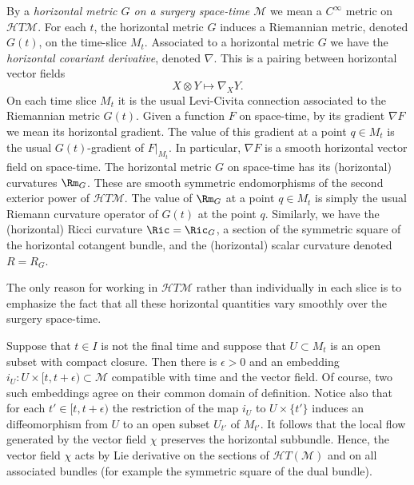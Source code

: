 \begin{definition}
\label{def:horizontal-metric}
By a {\em horizontal metric $G$ on a surgery space-time ${\mathcal
M}$} we mean a $C^\infty$ metric on ${\mathcal HT}{\mathcal M}$. For
each $t$, the horizontal metric $G$ induces a Riemannian metric,
denoted $G(t)$, on the time-slice $M_t$. Associated to a horizontal
metric $G$ we have the {\em horizontal covariant derivative},
denoted $\nabla$. This is a pairing between horizontal vector fields
$$X\otimes Y\mapsto \nabla_XY.$$
On each time slice $M_t$ it is the usual Levi-Civita connection associated to
the Riemannian metric $G(t)$. Given a function $F$ on space-time, by its
gradient $\nabla F$ we mean its horizontal gradient. The value of this gradient
at a point $q\in M_t$ is the usual $G(t)$-gradient of $F|_{M_t}$. In
particular, $\nabla F$ is a smooth horizontal vector field on space-time. The
horizontal metric $G$ on space-time has its (horizontal) curvatures $\Rm_G$.
These are smooth symmetric endomorphisms of the second exterior power of
${\mathcal HT}{\mathcal M}$. The value of $\Rm_G$ at a point $q\in M_t$ is
simply the usual Riemann curvature operator of $G(t)$ at the point $q$.
Similarly, we have the (horizontal) Ricci curvature $\Ric=\Ric_G$, a
section of the symmetric square of the horizontal cotangent bundle, and the
(horizontal) scalar curvature denoted $R=R_G$.
\end{definition}

The only reason for working in ${\mathcal HT}{\mathcal M}$ rather
than individually in each slice is to emphasize the fact that all
these horizontal quantities vary smoothly over the surgery
space-time.


Suppose that $t\in I$ is not the final time and suppose that
$U\subset M_{t}$ is an open subset with compact closure. Then there
is $\epsilon>0$ and an embedding $i_U\colon
U\times[t,t+\epsilon)\subset {\mathcal M}$ compatible with time and
the vector field. Of course, two such embeddings agree on their
common domain of definition. Notice also that for each $t'\in
[t,t+\epsilon)$ the restriction of the map $i_U$ to $U\times \{t'\}$
induces an diffeomorphism from $U$ to an open subset $U_{t'}$ of
$M_{t'}$. It follows that the local flow generated by the vector
field $\chi$ preserves the horizontal subbundle. Hence, the vector
field $\chi$ acts by Lie derivative on the sections of ${\mathcal
HT}({\mathcal M})$ and on all associated bundles (for example the
symmetric square of the dual bundle).




